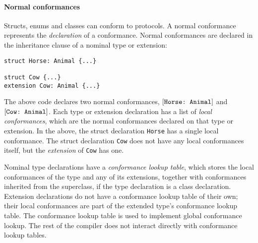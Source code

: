\documentclass[../generics]{subfiles}
\begin{document}
%
%
%
%
%
\paragraph{Normal conformances} Structs, enums and classes can conform to protocols. A normal conformance represents the \emph{declaration} of a conformance. Normal conformances are declared in the inheritance clause of a nominal type or extension:
\begin{Verbatim}
struct Horse: Animal {...}

struct Cow {...}
extension Cow: Animal {...}
\end{Verbatim}
The above code declares two normal conformances, $[\texttt{Horse:~Animal}]$ and $[\texttt{Cow:~Animal}]$.
Each type or extension declaration has a list of \emph{local conformances}, which are the normal conformances declared on that type or extension. In the above, the struct declaration \texttt{Horse} has a single local conformance. The struct declaration \texttt{Cow} does not have any local conformances itself, but the \emph{extension} of \texttt{Cow} has one. 

Nominal type declarations have a \emph{conformance lookup table}, which stores the local conformances of the type and any of its extensions, together with conformances inherited from the superclass, if the type declaration is a class declaration. Extension declarations do not have a conformance lookup table of their own; their local conformances are part of the extended type's conformance lookup table. The conformance lookup table is used to implement global conformance lookup. The rest of the compiler does not interact directly with conformance lookup tables.
\end{document}
